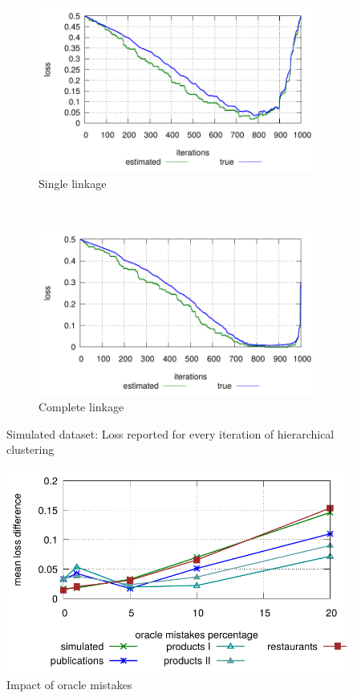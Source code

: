 \documentclass[12pt]{article}
\begin{document}
\begin{figure}[t]
    \centering
    \begin{subfigure}[t]{0.5\textwidth}
        \centering
        \includegraphics[trim=100 0 100 0, width=0.5\linewidth,valign=t]{figures/deDuplication/plot_simulated_s.pdf}
        \caption{Single linkage}
    \end{subfigure}%
    ~ 
    \begin{subfigure}[t]{0.5\textwidth}
        \centering
        \includegraphics[trim=100 0 100 0, width=0.5\linewidth,valign=t]{figures/deDuplication/plot_simulated_c.pdf}
        \caption{Complete linkage}
    \end{subfigure}
	\caption{Simulated dataset: Loss reported for every iteration of hierarchical clustering}
    \label{fig:simulated}
\end{figure}

\begin{figure}[t]
    \centering
    \includegraphics[width=\linewidth,valign=t]{figures/deDuplication/plot_oracle_error.pdf}
    \caption{Impact of oracle mistakes}
    \label{fig:oracle-error}
\end{figure}
    
\end{document}
